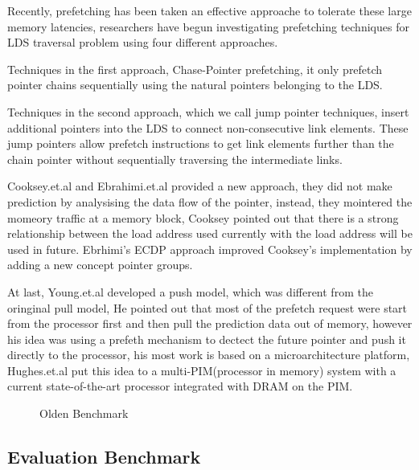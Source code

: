 \documentclass{acm_proc_article-sp}
\begin{document}
Recently, prefetching has been taken an effective approache to tolerate these 
large memory latencies, researchers have begun investigating prefetching
techniques for LDS traversal problem using four different
approaches.\cite{Harrison:1996:EMA:237578.237595}  

Techniques in the first approach, Chase-Pointer prefetching,
it only prefetch pointer chains sequentially using the natural
pointers belonging 
to the LDS.\cite{Luk:1996:CPR:248208.237190}
\cite{Roth:1998:DBP:384265.291034}\cite{Choi:2004:GFP:986533.986536} 

Techniques in the second approach, which we call
jump pointer techniques, insert additional pointers into the LDS
to connect non-consecutive link elements.\cite{Roth:1999:EJP:307338.300989}
\cite{Collins:2002:PCA:774861.774869}\cite{824351}
These jump pointers allow prefetch instructions to get link
elements further than the chain pointer without sequentially
traversing the intermediate links. 

Cooksey.et.al and Ebrahimi.et.al provided a new approach, they did not
make prediction by analysising the data flow of the pointer, instead,
they mointered the momeory traffic at a memory block, Cooksey
pointed out that there is a strong relationship between the load address
used currently with the load address will be used in future. Ebrhimi's
ECDP approach improved Cooksey's implementation by adding a new
concept pointer groups. 
\cite{Cooksey:2002:SCD:635506.605427}\cite{4798232}

At last, Young.et.al developed a push model, which was different from
the oringinal pull model, He pointed out that most of the prefetch
request were start from the processor first and then pull the
prediction data out of memory, however his idea was using a prefeth
mechanism to dectect the future pointer and push it directly to the
processor, his most work is based on a microarchitecture platform,
Hughes.et.al put this idea to a multi-PIM(processor in memory) system
with a current state-of-the-art processor integrated with DRAM on the PIM.
\cite{Yang:2002:PMH:646349.690705}\cite{Hughes:2005:MPL:1066486.1066491}

\begin{figure*}
\centering
{}
\caption{Olden Benchmark}
\end{figure*}

\subsection{Evaluation Benchmark }
\end{document}
